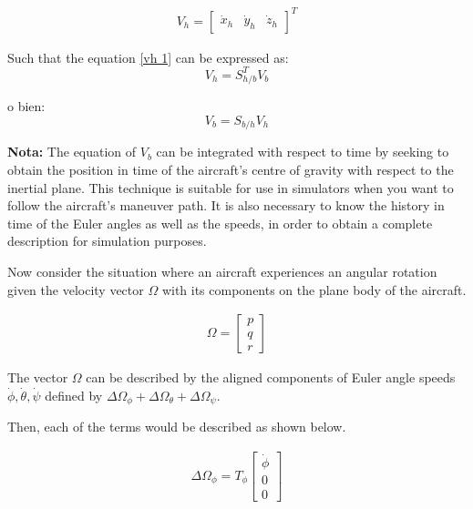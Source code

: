 \begin{gather}
    V_{h}
    =
    \begin{bmatrix}
    \dot x_{h} & \dot y_{h} & \dot z_{h} 
    \end{bmatrix}^T
\end{gather}

Such that the equation \ref{vh 1} can be expressed as:
\begin{equation}
    V_{h} = S_{h/b}^{T} V_{b}
\end{equation}

o bien:
\begin{equation}
    V_{b} = S_{b/h} V_{h}
\end{equation}


\textbf{Nota:} The equation of $V_{b}$ can be integrated with respect to time by seeking to obtain the position in time of the aircraft's centre of gravity with respect to the inertial plane. This technique is suitable for use in simulators when you want to follow the aircraft's maneuver path. It is also necessary to know the history in time of the Euler angles as well as the speeds, in order to obtain a complete description for simulation purposes.

\medskip

Now consider the situation where an aircraft experiences an angular rotation given the velocity vector $\Omega$ with its components on the plane body of the aircraft.

\begin{gather}
    \Omega
    =
    \begin{bmatrix}
    p\\
    q\\
    r
    \end{bmatrix}
\end{gather}

The vector $\Omega$ can be described by the aligned components of Euler angle speeds $ \dot \phi, \dot \theta, \dot \psi$ defined by $\Delta \Omega_{\phi} + \Delta \Omega_{\theta} + \Delta \Omega_{\psi}$.

Then, each of the terms would be described as shown below.

\begin{gather}
\label{euler1}
    \Delta \Omega_{\phi}
    =
    T_{\phi}
    \begin{bmatrix}
    \dot \phi\\
    0\\
    0
    \end{bmatrix}
\end{gather}

